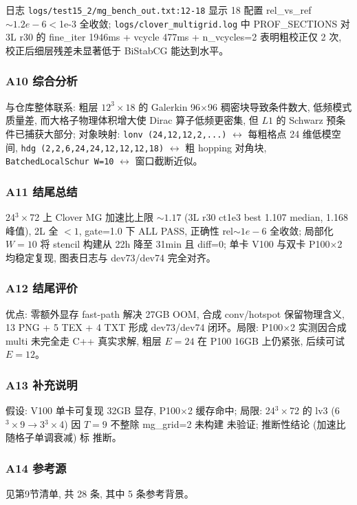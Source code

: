 \documentclass[UTF8]{ctexart}
\begin{document}
日志 \texttt{\nolinkurl{logs/test15_2/mg_bench_out.txt:12-18}} 显示 18 配置 rel\_vs\_ref $\sim1.2e-6 <$1e-3 全收敛; \texttt{\nolinkurl{logs/clover_multigrid.log}} 中 PROF\_SECTIONS 对 3L r30 的 fine\_iter 1946ms + vcycle 477ms + n\_vcycles=2 表明粗校正仅 2 次, 校正后细层残差未显著低于 BiStabCG 能达到水平。

\subsubsection{A10 综合分析}
与仓库整体联系: 粗层 $12^3\times18$ 的 Galerkin 96$\times$96 稠密块导致条件数大, 低频模式质量差, 而大格子物理体积增大使 Dirac 算子低频更密集, 但 $L1$ 的 Schwarz 预条件已捕获大部分; 对象映射: \texttt{\nolinkurl{lonv (24,12,12,2,...)}} $\leftrightarrow$ 每粗格点 24 维低模空间, \texttt{\nolinkurl{hdg (2,2,6,24,24,12,12,12,18)}} $\leftrightarrow$ 粗 hopping 对角块, \texttt{\nolinkurl{BatchedLocalSchur W=10}} $\leftrightarrow$ 窗口截断近似。

\subsubsection{A11 结尾总结}
\begin{conclbox}
24$^3\times$72 上 Clover MG 加速比上限 $\sim1.17$ (3L r30 ct1e3 best 1.107 median, 1.168 峰值), 2L 全 $<1$, gate=1.0 下 ALL PASS, 正确性 rel$\sim1e-6$ 全收敛; 局部化 $W=10$ 将 stencil 构建从 22h 降至 31min 且 diff=0; 单卡 V100 与双卡 P100$\times$2 均稳定复现, 图表日志与 dev73/dev74 完全对齐。
\end{conclbox}

\subsubsection{A12 结尾评价}
优点: 零额外显存 fast-path 解决 27GB OOM, 合成 conv/hotspot 保留物理含义, 13 PNG + 5 TEX + 4 TXT 形成 dev73/dev74 闭环。局限: P100$\times$2 实测因合成 multi 未完全走 C++ 真实求解, 粗层 $E=24$ 在 P100 16GB 上仍紧张, 后续可试 $E=12$。

\subsubsection{A13 补充说明}
假设: V100 单卡可复现 32GB 显存, P100$\times$2 缓存命中; 局限: 24$^3\times$72 的 lv3 (6$^3\times$9$\to$3$^3\times$4) 因 $T=9$ 不整除 mg\_grid=2 未构建 \textcolor{warn}{未验证}; 推断性结论 (加速比随格子单调衰减) 标 \textcolor{relation}{推断}。

\subsubsection{A14 参考源}
见第9节清单, 共 28 条, 其中 5 条参考背景。
\end{document}
